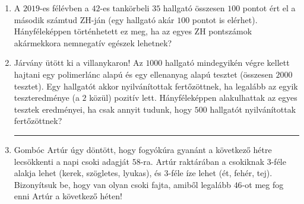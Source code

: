 \documentclass[a4paper,12pt]{article}
\begin{document}
\begin{enumerate}
        \item A $2019$-es félévben a $42$-es tankörbeli $35$ hallgató összesen $100$ pontot ért el a második számtud ZH-ján (egy hallgató akár $100$ pontot is elérhet). Hányféleképpen történhetett ez meg, ha az egyes ZH pontszámok akármekkora nemnegatív egészek lehetnek?
        



        \item Járvány ütött ki a villanykaron! Az $1000$ hallgató mindegyikén végre kellett hajtani egy polimerlánc alapú és egy ellenanyag alapú tesztet (összesen $2000$ tesztet). Egy hallgatót akkor nyilvánítottak fertőzöttnek, ha legalább az egyik teszteredménye (a $2$ közül) pozitív lett. Hányféleképpen alakulhattak az egyes tesztek eredményei, ha csak annyit tudunk, hogy $500$ hallgatót nyilvánítottak fertőzöttnek?

        \hrule

        \item Gombóc Artúr úgy döntött, hogy fogyókúra gyanánt a következő hétre lecsökkenti a napi csoki adagját $58$-ra. Artúr raktárában a csokiknak $3$-féle alakja lehet (kerek, szögletes, lyukas), és $3$-féle íze lehet (ét, fehér, tej). Bizonyítsuk be, hogy van olyan csoki fajta, amiből legalább $46$-ot meg fog enni Artúr a következő héten!
        

\end{enumerate}
\end{document}
